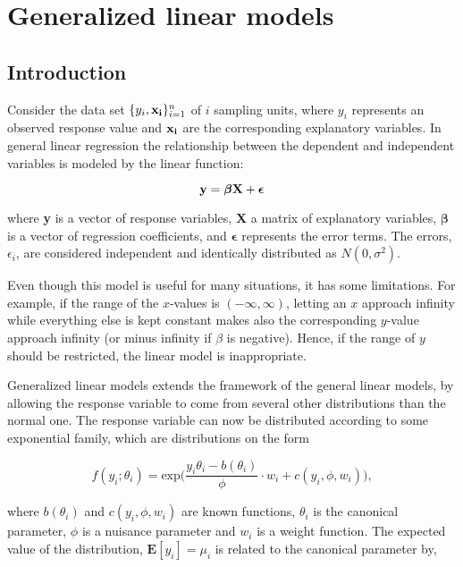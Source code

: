 \section{Generalized linear models}
\label{sec:stats}

\subsection{Introduction}
\label{Intro_GLM}
Consider the data set $ \{y_{i}, \bold{x_{i}}\}_{i=1}^{n} $ of $i$ sampling units, where $y_i$ represents an observed response value and $ \bold{x_i}$ are the corresponding explanatory variables. In general linear regression the relationship between the dependent and independent variables is modeled by the linear function:

\begin{equation}
\label{eq:general}
    \textbf{y} = \bm{ \beta}\bf X + \bm{ \epsilon}
\end{equation}

where \textbf{y} is a vector of response variables, \textbf{X} a matrix of explanatory variables, $\bm{\beta}$ is a vector of regression coefficients, and $\bm{ \epsilon}$ represents the error terms. The errors, $\epsilon_{i}$, are considered independent and identically distributed as $N(0, \sigma^{2})$.

Even though this model is useful for many situations, it has some limitations. For example, if the range of the $x$-values is $(-\infty, \infty)$, letting an $x$ approach infinity while everything else is kept constant makes also the corresponding $y$-value approach infinity (or minus infinity if $\beta$ is negative). Hence, if the range of $y$ should be restricted, the linear model is inappropriate. 

Generalized linear models extends the framework of the general linear models, by allowing the response variable to come from several other distributions than the normal one. The response variable can now be distributed according to some exponential family, which are distributions on the form

\begin{equation}
    f(y_i;\theta_i) = \text{exp}\Big(\frac{y_i \theta_i - b(\theta_i)}{\phi} \cdot w_i + c(y_i,\phi,w_i)\Big),
\end{equation}

where $b(\theta_i)$ and $c(y_i,\phi,w_i)$ are known functions, $\theta_i$ is the canonical parameter, $\phi$ is a nuisance parameter and $w_i$ is a weight function. The expected value of the distribution, $\mathbf{E}[y_i] = \mu_i$ is related to the canonical parameter by,

